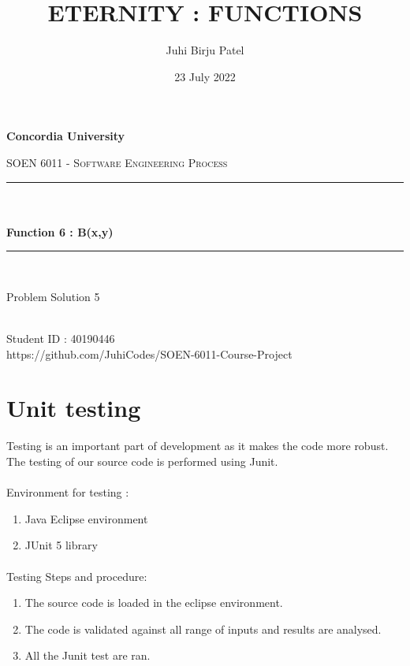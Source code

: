 \documentclass[12pt]{report}
\title{ETERNITY : FUNCTIONS}
\author{Juhi Birju Patel}
\date{23 July 2022}
\makeatletter
\let\thetitle\@title
\let\theauthor\@author
\makeatother
\begin{document}
\begin{titlepage}
	\centering
    \vspace*{0.5 cm}
\begin{center}    \textbf{\Large Concordia University}\\[2.0 cm]	\end{center}
	\textsc{\Large  SOEN 6011 - Software Engineering Process }\\[0.5 cm]
	\rule{\linewidth}{0.2 mm} \\[0.4 cm]
	{ \huge \textbf \thetitle}\\[0.2 cm]
	{ \huge \textbf{ Function 6 : B(x,y)}}
	\rule{\linewidth}{0.2 mm} \\[1.5 cm]

\begin{center}   {\Large Problem Solution 5}\\[2.0 cm]
\end{center}	
\begin{center}   {\Large \textbf{\theauthor}} \\[0.2 cm]
                 {\large Student ID : 40190446 }\\[0.2 cm]
                 {\large https://github.com/JuhiCodes/SOEN-6011-Course-Project}
\end{center}
	
\end{titlepage}

\tableofcontents
\pagebreak
\renewcommand{\thesection}{\arabic{section}}
\newpage
\section{Unit testing}

Testing is an important part of development as it makes the code more robust. The testing of our source code is performed using Junit.

\paragraph{}Environment for testing :
\begin{enumerate}
    \item Java Eclipse environment 
    \item JUnit 5 library
\end{enumerate}

\paragraph{}Testing Steps and procedure:
\begin{enumerate}
    \item The source code is loaded in the eclipse environment.
    \item The code is validated against all range of inputs and results are analysed.
    \item All the Junit test are ran.
\end{enumerate}
\end{document}
